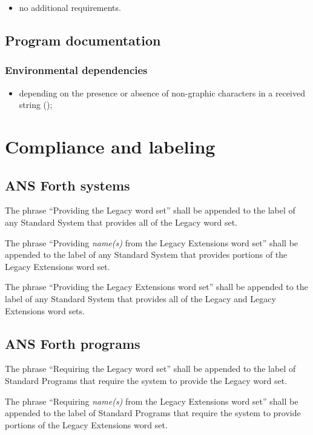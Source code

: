 \begin{itemize}
\item no additional requirements.
\end{itemize}

\subsection{Program documentation} %

\subsubsection{Environmental dependencies} %

\begin{itemize}
\item depending on the presence or absence of non-graphic characters
	in a received string ();
\end{itemize}


\section{Compliance and labeling} %

\subsection{ANS Forth systems} %

The phrase ``Providing the Legacy word set'' shall be appended to
the label of any Standard System that provides all of the Legacy
word set.

The phrase ``Providing \emph{name(s)} from the Legacy Extensions
word set'' shall be appended to the label of any Standard System
that provides portions of the Legacy Extensions word set.

The phrase ``Providing the Legacy Extensions word set'' shall be
appended to the label of any Standard System that provides all of
the Legacy and Legacy Extensions word sets.

\subsection{ANS Forth programs} %

The phrase ``Requiring the Legacy word set'' shall be appended to
the label of Standard Programs that require the system to provide
the Legacy word set.

The phrase ``Requiring \emph{name(s)} from the Legacy Extensions
word set'' shall be appended to the label of Standard Programs that
require the system to provide portions of the Legacy Extensions
word set.

